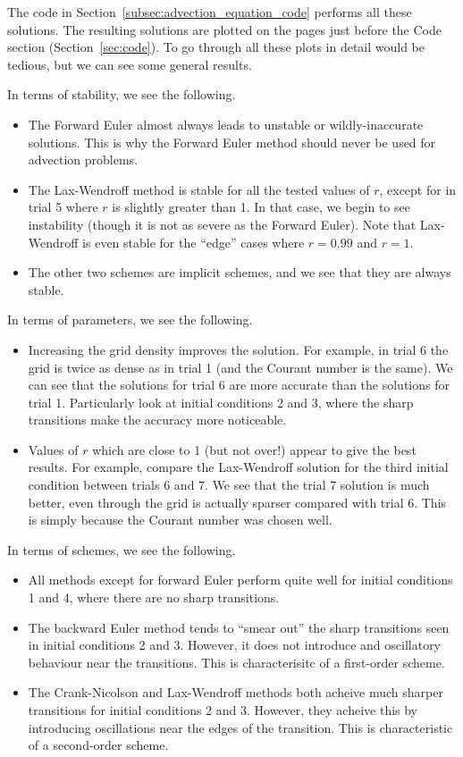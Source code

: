 \documentclass[twocolumn]{myarticle}
\begin{document}
The code in Section~\ref{subsec:advection_equation_code} performs all these solutions.
The resulting solutions are plotted on the pages just before the Code section (Section~\ref{sec:code}).
To go through all these plots in detail would be tedious, but we can see some general results.

In terms of stability, we see the following.
\begin{itemize}
\item
    The Forward Euler almost always leads to unstable or wildly-inaccurate solutions.
    This is why the Forward Euler method should never be used for advection problems.
\item
    The Lax-Wendroff method is stable for all the tested values of $ r $, except for in trial 5 where $ r $ is slightly greater than 1.
    In that case, we begin to see instability (though it is not as severe as the Forward Euler).
    Note that Lax-Wendroff is even stable for the ``edge'' cases where $ r = 0.99 $ and $ r = 1 $.
\item
    The other two schemes are implicit schemes, and we see that they are always stable.
\end{itemize}

In terms of parameters, we see the following.
\begin{itemize}
\item
    Increasing the grid density improves the solution.
    For example, in trial 6 the grid is twice as dense as in trial 1 (and the Courant number is the same).
    We can see that the solutions for trial 6 are more accurate than the solutions for trial 1.
    Particularly look at initial conditions 2 and 3, where the sharp transitions make the accuracy more noticeable.
\item
    Values of $ r $ which are close to 1 (but not over!) appear to give the best results.
    For example, compare the Lax-Wendroff solution for the third initial condition between trials 6 and 7.
    We see that the trial 7 solution is much better, even through the grid is actually sparser compared with trial 6.
    This is simply because the Courant number was chosen well.
\end{itemize}

In terms of schemes, we see the following.
\begin{itemize}
\item
    All methods except for forward Euler perform quite well for initial conditions 1 and 4, where there are no sharp transitions.
\item
    The backward Euler method tends to ``smear out'' the sharp transitions seen in initial conditions 2 and 3.
    However, it does not introduce and oscillatory behaviour near the transitions.
    This is characterisitc of a first-order scheme.
\item
    The Crank-Nicolson and Lax-Wendroff methods both acheive much sharper transitions for initial conditions 2 and 3.
    However, they acheive this by introducing oscillations near the edges of the transition.
    This is characteristic of a second-order scheme.
\end{itemize}
\end{document}
